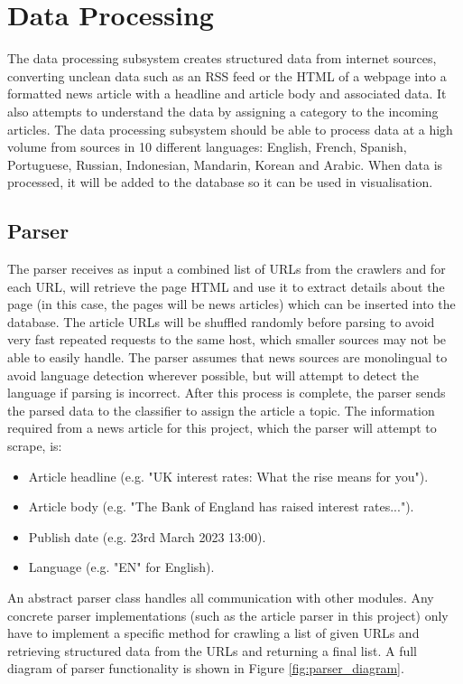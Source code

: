 \documentclass{l4proj}
\begin{document}
\section{Data Processing}
The data processing subsystem creates structured data from internet sources, converting unclean data such as an RSS feed or the HTML of a webpage into a formatted news article with a headline and article body and associated data. It also attempts to understand the data by assigning a category to the incoming articles. The data processing subsystem should be able to process data at a high volume from sources in 10 different languages: English, French, Spanish, Portuguese, Russian, Indonesian, Mandarin, Korean and Arabic. When data is processed, it will be added to the database so it can be used in visualisation.

\subsection{Parser}
The parser receives as input a combined list of URLs from the crawlers and for each URL, will retrieve the page HTML and use it to extract details about the page (in this case, the pages will be news articles) which can be inserted into the database. The article URLs will be shuffled randomly before parsing to avoid very fast repeated requests to the same host, which smaller sources may not be able to easily handle. The parser assumes that news sources are monolingual to avoid language detection wherever possible, but will attempt to detect the language if parsing is incorrect. After this process is complete, the parser sends the parsed data to the classifier to assign the article a topic. The information required from a news article for this project, which the parser will attempt to scrape, is:
\begin{itemize}
    \item Article headline (e.g. "UK interest rates: What the rise means for you").
    \item Article body (e.g. "The Bank of England has raised interest rates...").
    \item Publish date (e.g. 23rd March 2023 13:00).
    \item Language (e.g. "EN" for English).
\end{itemize}
 An abstract parser class handles all communication with other modules. Any concrete parser implementations (such as the article parser in this project) only have to implement a specific method for crawling a list of given URLs and retrieving structured data from the URLs and returning a final list. A full diagram of parser functionality is shown in Figure \ref{fig:parser_diagram}.
\end{document}
